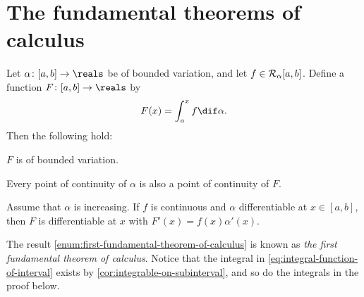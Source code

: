 \documentclass[article, a4paper, 11pt, oneside]{memoir}
\numberwithin{equation}{chapter}
\begin{document}
\section{The fundamental theorems of calculus}

\begin{theorem}
    Let $\alpha \colon [a,b] \to \reals$ be of bounded variation, and let $f \in \integrable[\alpha]{a,b}$. Define a function $F \colon [a,b] \to \reals$ by
    \begin{equation}
        \label{eq:integral-function-of-interval}
        F(x)
            = \int_a^x f \dif\alpha.
    \end{equation}
    Then the following hold:
    \begin{enumthm}
        \item \label{enum:integral-is-BV} $F$ is of bounded variation.
        \item \label{enum:continuity-of-integral} Every point of continuity of $\alpha$ is also a point of continuity of $F$.
        \item \label{enum:first-fundamental-theorem-of-calculus} Assume that $\alpha$ is increasing. If $f$ is continuous and $\alpha$ differentiable at $x \in [a,b]$, then $F$ is differentiable at $x$ with $F'(x) = f(x) \alpha'(x)$.
    \end{enumthm}
\end{theorem}
%
The result \cref{enum:first-fundamental-theorem-of-calculus} is known as \emph{the first fundamental theorem of calculus}. Notice that the integral in \cref{eq:integral-function-of-interval} exists by \cref{cor:integrable-on-subinterval}, and so do the integrals in the proof below.
\end{document}

